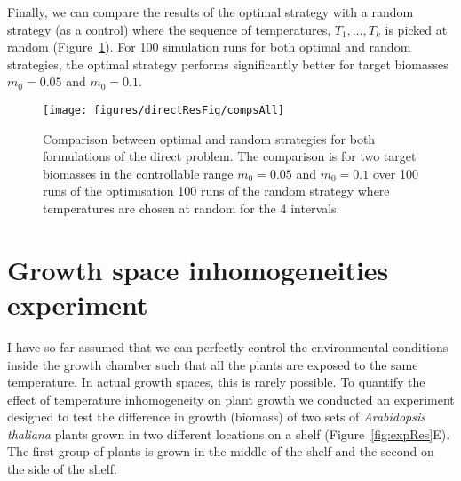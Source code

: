 Finally, we can compare the results of the optimal strategy with a random
strategy (as a control) where the sequence of temperatures, $T_1, \dots, T_k$ is
picked at random (Figure~\ref{fig:compsAllDir}). For 100 simulation runs for
both optimal and random strategies, the optimal strategy performs significantly
better for target biomasses $m_0=0.05$ and $m_0=0.1$.

\begin{figure}[tb]
\centering
\texttt{[image: figures/directResFig/compsAll]}
\caption{
  Comparison between optimal and random strategies for both formulations of the
  direct problem. The comparison is for two target biomasses in the controllable
  range $m_0=0.05$ and $m_0=0.1$ over 100 runs of the optimisation 100 runs of
  the random strategy where temperatures are chosen at random for the 4
  intervals.
}
\label{fig:compsAllDir}
\end{figure}


\section{Growth space inhomogeneities experiment}
\label{sec:exp}
I have so far assumed that we can perfectly control the environmental
conditions inside the growth chamber such that all the plants are exposed to the
same temperature. In actual growth spaces, this is rarely possible. To quantify
the effect of temperature inhomogeneity on plant growth we conducted an
experiment designed to test the difference in growth (biomass) of two sets of
\textit{Arabidopsis thaliana} plants grown in two different locations on a shelf
(Figure~\ref{fig:expRes}E). The first group of plants is grown in the middle of
the shelf and the second on the side of the shelf.


